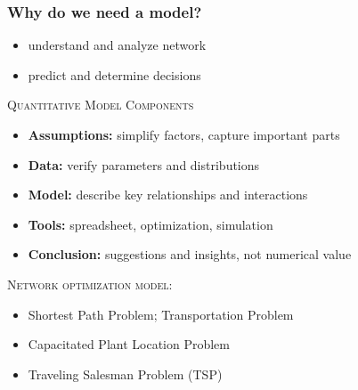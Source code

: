 \documentclass[10pt,handout,notes=show]{beamer}
\begin{document}
\begin{frame}
  \frametitle{Why do we need a model?}
  \begin{itemize}
    \item understand and analyze network
    \item predict and determine decisions
  \end{itemize}

  \NextHalfLine
  \textsc{Quantitative Model Components}
  \begin{itemize}
    \item \textbf{Assumptions:} \alert{simplify factors}, capture important parts
    \item \textbf{Data:} verify parameters and distributions
    \item \textbf{Model:} describe key \alert{relationships} and interactions
    \item \textbf{Tools:} spreadsheet, optimization, simulation
    \item \textbf{Conclusion:} suggestions and \alert{insights}, not numerical value
  \end{itemize}

  \NextHalfLine
  \textsc{Network optimization model:} 
  \begin{itemize}
      \item<2-> Shortest Path Problem; Transportation Problem
      \item<2-> Capacitated Plant Location Problem
      \item<2-> Traveling Salesman Problem (TSP)
  \end{itemize}


 \end{frame}
\end{document}
